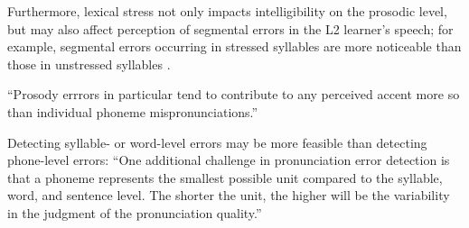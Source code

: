 		\citep{Warren2009}
		
		\citep{Magen1998}
		
		Furthermore, lexical stress not only impacts intelligibility on the prosodic level, but may also affect perception of segmental errors in the L2 learner's speech; for example, segmental errors occurring in stressed syllables are more noticeable than those in unstressed syllables \citep{Cutler2005}.
		
		``Prosody errrors in particular tend to contribute to any perceived accent more so than individual phoneme mispronunciations.'' \citep[p.~6]{Witt2012}
				
		\citep{Cutler2005}
		
		\citep{Peperkamp2002, Dupoux2001, Dupoux2008}
		
		 
		

		Detecting syllable- or word-level errors may be more feasible than detecting phone-level errors: ``One additional challenge in pronunciation error detection is that a phoneme represents the smallest possible unit compared to the syllable, word, and sentence level. The shorter the unit, the higher will be the variability in the judgment of the pronunciation quality.'' \citep[p.~2]{Witt2012}

		\citep{ISADEPT, Delmonte2011}
		
		\citep{Bonneau2011}
		
		\citep{Shahin2012a,Kim2011}
		

	

